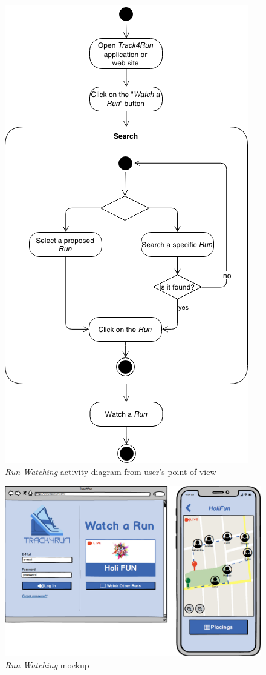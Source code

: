 \begin{figure}[H]
\begin{center}
  \includegraphics[height=0.6\paperheight]{img/activity/Watching.png}
  \hspace{0.05\linewidth}
  \centering
  \caption{\textit{Run Watching} activity diagram from user's point of view}
  \label{img:runWatchingActivityDiagram}
\end{center}
\end{figure}

\begin{figure}[H]
\begin{center}
  \includegraphics[width=\textwidth]{img/mockup/VisitRun.png}
  \hspace{0.05\linewidth}
  \centering
  \caption{\textit{Run Watching} mockup}
  \label{img:runWatchingMockup}
\end{center}
\end{figure}
